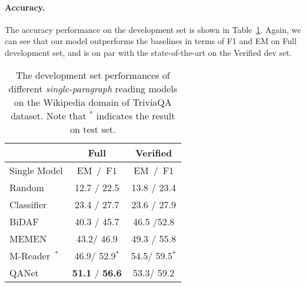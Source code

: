 \documentclass{article} \usepackage{iclr2018_conference,times}
\begin{document}
\paragraph{Accuracy.} The accuracy performance on the development set is shown in Table~\ref{table:triviaqa_all}. Again, we can see that our model outperforms the baselines in terms of F1 and EM on Full development set, and is on par with the state-of-the-art on the Verified dev set. 

  

\begin{table}[ht]
\small
\begin{center}
\begin{tabular}{lcc}
\hline & Full & Verified  \\\hline
Single Model & EM~/~F1  & EM~/~F1 \\\hline
Random~\citep{JoshiCWZ17} & 12.7 / 22.5 & 13.8 / 23.4\\
Classifier~\citep{JoshiCWZ17} & 23.4 / 27.7 & 23.6 / 27.9\\
BiDAF~\citep{SeoKFH16} & 40.3 / 45.7 & 46.5 /52.8 \\
MEMEN~\citep{PanLZCCH17} & 43.2/ 46.9  & 49.3 / 55.8\\
M-Reader~\citep{HuPQ17}$^*$ &  46.9/ 52.9$^*$ & 54.5/ 59.5$^*$\\
\hline
QANet & \textbf{51.1} / \textbf{56.6} &  53.3/ 59.2 \\
\hline \end{tabular}
\end{center}
\caption{The development set performances of different \textit{single-paragraph} reading models on the Wikipedia domain of TriviaQA dataset. Note that $^*$ indicates the result on test set.
}
\label{table:triviaqa_all}
\end{table}
\end{document}
